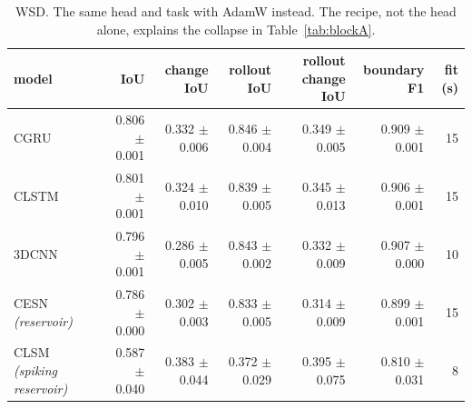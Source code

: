 \begin{table}[t]
\centering\small
\begin{tabular}{lrrrrrr}
\toprule
model & IoU & change IoU & rollout IoU & rollout change IoU & boundary F1 & fit (s) \\
\midrule
CGRU & 0.806 {\scriptsize$\pm$ 0.001} & 0.332 {\scriptsize$\pm$ 0.006} & 0.846 {\scriptsize$\pm$ 0.004} & 0.349 {\scriptsize$\pm$ 0.005} & 0.909 {\scriptsize$\pm$ 0.001} & 15 \\
CLSTM & 0.801 {\scriptsize$\pm$ 0.001} & 0.324 {\scriptsize$\pm$ 0.010} & 0.839 {\scriptsize$\pm$ 0.005} & 0.345 {\scriptsize$\pm$ 0.013} & 0.906 {\scriptsize$\pm$ 0.001} & 15 \\
3DCNN & 0.796 {\scriptsize$\pm$ 0.001} & 0.286 {\scriptsize$\pm$ 0.005} & 0.843 {\scriptsize$\pm$ 0.002} & 0.332 {\scriptsize$\pm$ 0.009} & 0.907 {\scriptsize$\pm$ 0.000} & 10 \\
CESN \emph{(reservoir)} & 0.786 {\scriptsize$\pm$ 0.000} & 0.302 {\scriptsize$\pm$ 0.003} & 0.833 {\scriptsize$\pm$ 0.005} & 0.314 {\scriptsize$\pm$ 0.009} & 0.899 {\scriptsize$\pm$ 0.001} & 15 \\
CLSM \emph{(spiking reservoir)} & 0.587 {\scriptsize$\pm$ 0.040} & 0.383 {\scriptsize$\pm$ 0.044} & 0.372 {\scriptsize$\pm$ 0.029} & 0.395 {\scriptsize$\pm$ 0.075} & 0.810 {\scriptsize$\pm$ 0.031} & 8 \\
\bottomrule
\end{tabular}
\caption{WSD. The same head and task with AdamW instead. The recipe, not the head alone, explains the collapse in Table~\ref{tab:blockA}.}
\label{tab:blockF}
\end{table}


